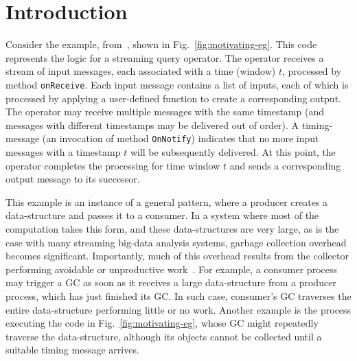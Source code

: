 \newcommand{\TODO}[1]{\textbf{TODO: #1}} \newcommand{\eg}{\emph{e.g.}}
\newcommand{\ie}{\emph{i.e.}}

\section{Introduction} \label{sec:introduction}

Consider the example, from~\cite{Broom:HotOS}, shown in
Fig.~\ref{fig:motivating-eg}.  This code represents the logic for a
streaming query operator.  The operator receives a stream of input
messages, each associated with a time (window) $t$, processed by
method \texttt{onReceive}.  Each input message contains a list of
inputs, each of which is processed by applying a user-defined function
to create a corresponding output.  The operator may receive multiple
messages with the same timestamp (and messages with different
timestamps may be delivered out of order).  A timing-message (an
invocation of method \texttt{OnNotify}) indicates that no more input
messages with a timestamp $t$ will be subsequently delivered.  At this
point, the operator completes the processing for time window $t$ and
sends a corresponding output message to its successor.



This example is an instance of a general pattern, where a producer
creates a data-structure and passes it to a consumer. In a system
where most of the computation takes this form, and these
data-structures are very large, as is the case with many streaming
big-data analysis systems, garbage collection overhead becomes
significant. Importantly, much of this overhead results from the
collector performing avoidable or unproductive
work~\cite{Broom:HotOS}. For example, a consumer process may trigger a
GC as soon as it receives a large data-structure from a producer
process, which has just finished its GC. In such case, consumer's GC
traverses the entire data-structure performing little or no work.
Another example is the process executing the code in
Fig.~\ref{fig:motivating-eg}, whose GC might repeatedly traverse the
 data-structure, although its objects cannot be collected until
a suitable timing message arrives.

